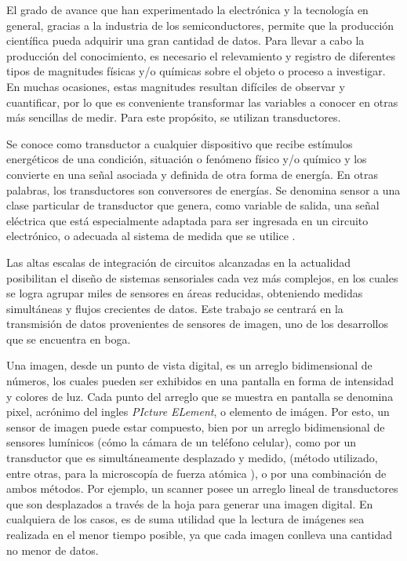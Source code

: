 El grado de avance que han experimentado la electrónica y la tecnología en general, gracias a la industria de los semiconductores, permite que la producción científica pueda adquirir una gran cantidad de datos. Para llevar a cabo la producción del conocimiento, es necesario el relevamiento y registro de diferentes tipos de magnitudes físicas y/o químicas sobre el objeto o proceso a investigar. En muchas ocasiones, estas magnitudes resultan difíciles de observar y cuantificar, por lo que es conveniente transformar las variables a conocer en otras más sencillas de medir. Para este propósito, se utilizan transductores.%

Se conoce como transductor a cualquier dispositivo que recibe estímulos energéticos de una condición, situación o fenómeno físico y/o químico y los convierte en una señal asociada y definida de otra forma de energía\cite{Pallas-Areny2001,considine1971encyclopedia}. En otras palabras, los transductores son conversores de energías\cite{considine1971encyclopedia,Pallas-Areny2001,PerezGarcia2008}. Se denomina sensor a una clase particular de transductor que genera, como variable de salida, una señal eléctrica que está especialmente adaptada para ser ingresada en un circuito electrónico, o adecuada al sistema de medida que se utilice \cite{Fraden2010,Slawinski2011,Ogata2002}.%

Las altas escalas de integración de circuitos alcanzadas en la actualidad posibilitan el diseño de sistemas sensoriales cada vez más complejos, en los cuales se logra agrupar miles de sensores en áreas reducidas, obteniendo medidas simultáneas y flujos crecientes de datos. Este trabajo se centrará en la transmisión de datos provenientes de sensores de imagen, uno de los desarrollos que se encuentra en boga.%

Una imagen, desde un punto de vista digital, es un arreglo bidimensional de números, los cuales pueden ser exhibidos en una pantalla en forma de intensidad y colores de luz. Cada punto del arreglo que se muestra en pantalla se denomina pixel, acrónimo del ingles {\it PIcture ELement}, o elemento de imágen. Por esto, un sensor de imagen puede estar compuesto, bien por un arreglo bidimensional de sensores lumínicos (cómo la cámara de un teléfono celular), como por un transductor que es simultáneamente desplazado y medido, (método utilizado, entre otras, para la microscopía de fuerza atómica \cite{Binnig1983}), o por una combinación de ambos métodos. Por ejemplo, un scanner posee un arreglo lineal de transductores que son desplazados a través de la hoja para generar una imagen digital. En cualquiera de los casos, es de suma utilidad que la lectura de imágenes sea realizada en el menor tiempo posible, ya que cada imagen conlleva una cantidad no menor de datos.%

